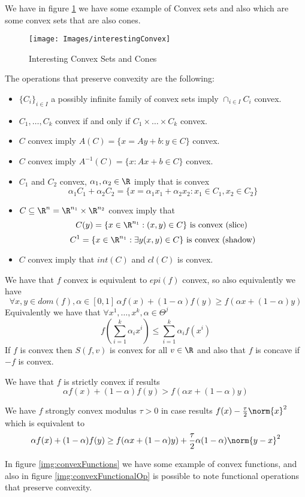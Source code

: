 We have in figure \ref{img:interestingConvex} we have some example of Convex sets and also 
which are some convex sets that are also cones.
\begin{figure}
	\texttt{[image: Images/interestingConvex]}
	\caption{Interesting Convex Sets and Cones}
	\label{img:interestingConvex}
\end{figure}
The operations that preserve convexity are the following:
\begin{itemize}
    \item $\{C_i\}_{i \in I}$ a possibly infinite family of convex sets imply $\cap_{i \in I} C_i$ convex.
    \item $C_1, \dots, C_k$ convex if and only if $C_1 \times \dots \times C_k$ convex.
    \item $C$ convex imply $A(C) = \{x = Ay + b: y \in C\}$ convex.
    \item $C$ convex imply $A^{-1}(C) = \{x: Ax + b \in C\}$ convex.
    \item $C_1$ and $C_2$ convex, $\alpha_1, \alpha_2 \in \R$ imply that is convex 
	    \[ \alpha_1C_1 + \alpha_2C_2 = \{x = \alpha_1x_1 + \alpha_2x_2: x_1 \in C_1, x_2 \in C_2\} \]
    \item $C \subseteq \R^n = \R^{n_1} \times \R^{n_2}$ convex imply that 
	    \[ C(y) = \{x \in \R^{n_1}: (x, y) \in C\} \text{ is convex (slice) } \]
	    \[ C^1 = \{x \in \R^{n_1}: \exists y (x, y) \in C\} \text{ is convex (shadow)} \]
    \item $C$ convex imply that $int(C)$ and $cl(C)$ is convex.
\end{itemize}
We have that $f$ convex is equivalent to $epi(f)$ convex, so also equivalently we have 
\[ \forall x, y \in dom(f), \alpha \in [0, 1] \, \alpha f(x) + (1 - \alpha)f(y) \geq f(\alpha x + (1 - \alpha)y) \]
Equivalently we have that $\forall x^1, \dots, x^k, \alpha \in \Theta^j$
\[ f(\sum_{i=1}^k \alpha_i x^i) \leq \sum_{i=1}^k \alpha_i f(x^i) \]
If $f$ is convex then $S(f, v)$ is convex for all $v \in \R$ and also that $f$ is concave if $-f$ is convex.

\begin{defi}
    We have that $f$ is strictly convex if results
    \[ \alpha f(x) + (1 - \alpha)f(y) > f(\alpha x + (1 - \alpha)y) \]
\end{defi}
\begin{defi}
    We have $f$ strongly convex modulus $\tau > 0$ in case results $f(x) - \frac{\tau}{2}\norm{x}^2$ which is 
    equivalent to 
    \[ \alpha f(x) + (1 - \alpha)f(y) \geq f(\alpha x + (1-\alpha)y) + \frac{\tau}{2}\alpha(1-\alpha)\norm{y-x}^2 \]
\end{defi}
In figure \ref{img:convexFunctions} we have some example of convex functions, and also 
in figure \ref{img:convexFunctionalOp} is possible to note functional operations that preserve convexity.


